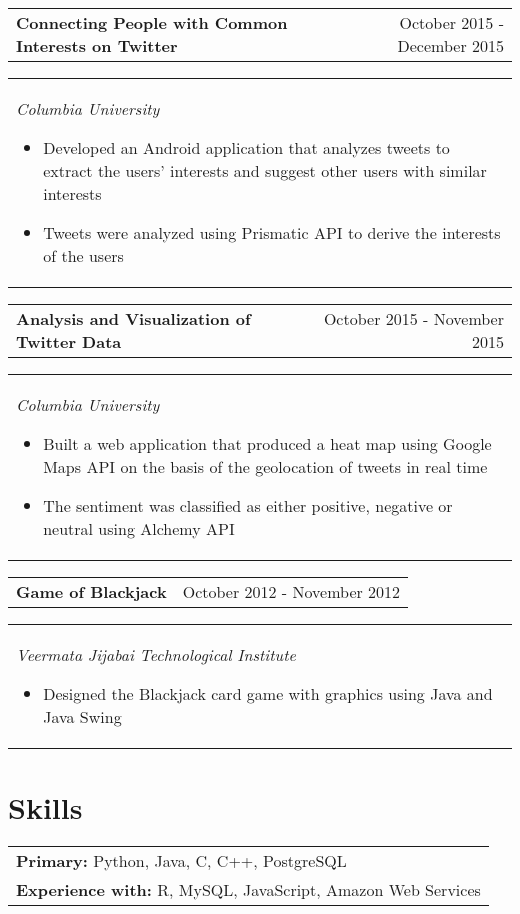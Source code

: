 \documentclass[margin,line]{res}
\begin{document}
\begin{resume}
\begin{tabular}{p{3.875in} r}
\bf Connecting People with Common Interests on Twitter & October 2015 - December 2015
\end{tabular}
\begin{tabular} {p{5.92in}}
\it Columbia University 
\begin{itemize}
    \item \textup{Developed an Android application that analyzes tweets to extract the users' interests and suggest other users with similar interests}
    \item \textup{Tweets were analyzed using Prismatic API to derive the interests of the users}
\end{itemize}
\end{tabular}

\begin{tabular}{p{3.875in} r}
\bf Analysis and Visualization of Twitter Data & October 2015 - November 2015
\end{tabular}
\begin{tabular}{p{5.92in}}
\it Columbia University
\begin{itemize}
    \item \textup{Built a web application that produced a heat map using Google Maps API on the basis of the geolocation of tweets in real time}
    \item \textup{The sentiment was classified as either positive, negative or neutral using Alchemy API}
\end{itemize}
\end{tabular}

\begin{tabular}{p{3.875in} r}
\bf Game of Blackjack   & October 2012 - November 2012
\end{tabular}
\begin{tabular} {p{5.92in}}
\it Veermata Jijabai Technological Institute
\begin{itemize}
    \item \textup{Designed the Blackjack card game with graphics using Java and Java Swing }
\end{itemize}
\end{tabular}

\section{\sc\bf Skills}
\begin{tabular}{p{5.92in}}
{\bf Primary:} Python, Java, C, C++, PostgreSQL\\
{\bf Experience with:} R, MySQL, JavaScript, Amazon Web Services
\end{tabular}


\end{resume}
\end{document}
